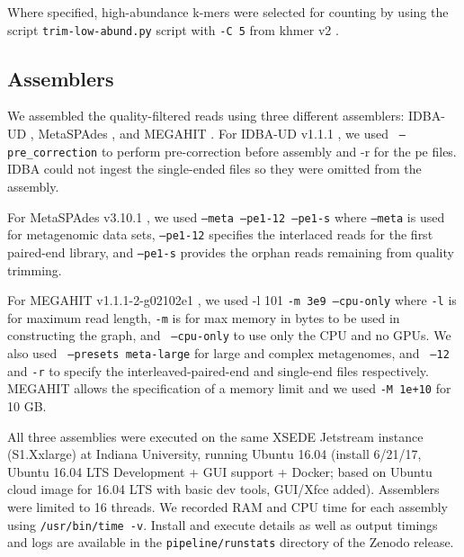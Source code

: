 \documentclass[11pt]{article}
\begin{document}

Where specified, high-abundance k-mers were selected for counting by
using the script {\tt trim-low-abund.py} script with {\tt -C 5} from
khmer v2 \cite{streaming, khmer2}.


\subsection*{Assemblers}

We assembled the quality-filtered reads using three different
assemblers: IDBA-UD \cite{idba}, MetaSPAdes \cite{metaspades}, and MEGAHIT
\cite{megahit}.  For IDBA-UD v1.1.1 \cite{idba}, we used {\tt
  {--pre\_correction}} to perform pre-correction before assembly and
-r for the pe files.  IDBA could not ingest the single-ended files so
they were omitted from the assembly.


For MetaSPAdes v3.10.1 \cite{metaspades}, we used { \tt {--meta --pe1-12
    --pe1-s}} where {\tt{--meta}} is used for
metagenomic data sets, {\tt{--pe1-12}} specifies the interlaced reads
for the first paired-end library, and {\tt{--pe1-s}} provides the
orphan reads remaining from quality trimming.


For MEGAHIT v1.1.1-2-g02102e1 \cite{megahit}, we used -l 101 {\tt{-m 3e9
    --cpu-only}} where {\tt -l} is for maximum read length, {\tt -m} is
for max memory in bytes to be used in constructing the graph, and {\tt
  {--cpu-only}} to use only the CPU and no GPUs. We also used {\tt
  {--presets meta-large}} for large and complex metagenomes, and {\tt
  {--12} } and {\tt{-r}} to specify the
interleaved-paired-end and single-end files respectively.  MEGAHIT allows
the specification of a memory limit and we used {\tt -M 1e+10} for 10 GB.


All three assemblies were executed on the same XSEDE Jetstream
instance (S1.Xxlarge) at Indiana University, running Ubuntu 16.04
(install 6/21/17, Ubuntu 16.04 LTS Development + GUI support + Docker;
based on Ubuntu cloud image for 16.04 LTS with basic dev tools,
GUI/Xfce added).  Assemblers were limited to 16 threads.  We recorded
RAM and CPU time for each assembly using {\tt /usr/bin/time -v}.
Install and execute details as well as output timings and logs are
available in the {\tt pipeline/runstats} directory of the Zenodo
release.
\end{document}
